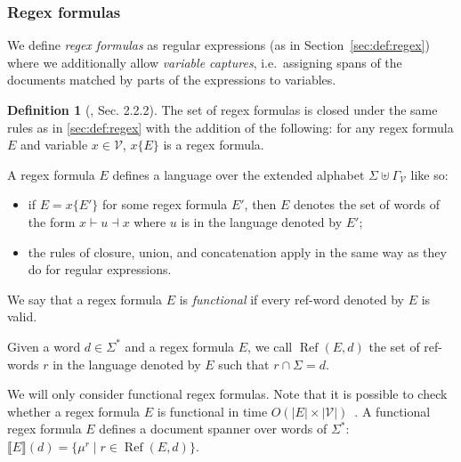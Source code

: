 \documentclass[12px]{article}
\theoremstyle{definition}
\newtheorem{definition}{Definition}
\DeclareMathOperator{\Ref}{Ref}
\begin{document}

      \subsubsection{Regex formulas}%
        \label{sec:regex_formula}

        We define \emph{regex formulas} as regular expressions (as in
        Section~\ref{sec:def:regex}) where we additionally allow \emph{variable
        captures}, i.e.\ assigning spans of the documents matched by parts of
        the expressions to variables.

        \begin{definition}[\cite{peterfreund}, Sec. 2.2.2]
          The set of regex formulas is closed under the same rules as in
          \ref{sec:def:regex} with the addition of the following: for any regex
          formula $E$ and variable $x \in \mathcal{V}$, $x\{E\}$ is a regex
          formula.

          A regex formula $E$ defines a language over the extended alphabet
          $\Sigma \uplus \Gamma_\mathcal{V}$ like so:
            \begin{itemize}
              \item if $E = x\{E'\}$ for some regex formula $E'$, then $E$ denotes
                the set of words of the form $x{\vdash} u {\dashv}x$ where $u$ is
                in the language denoted by $E'$;
              \item the rules of closure, union, and concatenation apply in the same
                way as they do for regular expressions.
            \end{itemize}

          We say that a regex formula $E$ is \textit{functional} if every
          ref-word denoted by $E$ is valid.

          Given a word $d \in \Sigma^*$ and a regex formula $E$, we call
          $\Ref(E, d)$ the set of ref-words $r$ in the language denoted by $E$
          such that $r \cap \Sigma = d$.
        \end{definition}

        We will only consider functional regex formulas. Note that it is
        possible to check whether a regex formula $E$ is functional in time
        $O(|E|\times|\mathcal{V}|)$~\cite{peterfreund}. A functional regex formula
        $E$ defines a document spanner over words of $\Sigma^*$: $\llbracket E
        \rrbracket (d) = \{\mu^r\mid r \in \Ref(E, d)\}$.
\end{document}
